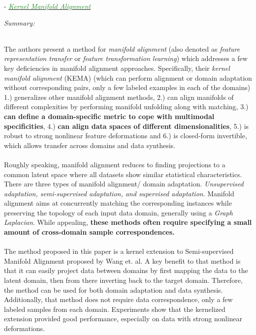 \documentclass[]{article}
\newcommand{\paperentry}[4]{
            \hangindent=1cm
            \textcolor{red}{\cite{#1}} - \href{run:../References/#3}{\textcolor{ForestGreen}{\textit{#2}}}
            
            \noindent            
            \begin{minipage}[t]{0.1\linewidth}\hfill\end{minipage}
            \begin{minipage}[t]{0.8\linewidth}\textcolor{NavyBlue}{{\textit{Summary:}}}#4\end{minipage}
            \vspace{.25cm}
          }
\begin{document}
		\paperentry{Tuia2015KernelManifoldAlignment}
		{Kernel Manifold Alignment}
		{Manifold_Representation_Learning/Alignment/Tuia2015KernelManifoldAlignment.pdf}
		{}\\
		The authors present a method for \textit{manifold alignment} (also denoted as \textit{feature representation transfer} or \textit{feature transformation learning}) 
		which addresses a few key deficiencies in manifold alignment approaches. Specifically, their \textit{kernel manifold alignment} (KEMA) (which can perform alignment or domain adaptation without corresponding pairs, only a few labeled examples in each of the domains) 1.) generalizes other manifold alignment methods, 2.) can align manifolds of different complexities by performing manifold unfolding along with matching, 3.) \textbf{can define a domain-specific metric to cope with multimodal specificities}, 4.) \textbf{can align data spaces of different dimensionalities}, 5.) is robust to strong nonlinear feature deformations and 6.) is closed-form invertible, which allows transfer across domains and data synthesis.
		\\ \\
		Roughly speaking, manifold alignment reduces to finding projections to a common latent space where all datasets show similar statistical characteristics.  There are three types of manifold alignment/ domain adaptation.  \textit{Unsupervised adaptation, semi-supervised adaptation, and supervised adaptation}.  Manifold alignment aims at concurrently matching the corresponding instances while preserving the topology of each input data domain, generally using a \textit{Graph Laplacian}.  While appealing, \textbf{these methods often require specifying a small amount of cross-domain sample correspondences.}
		\\ \\
		The method proposed in this paper is a kernel extension to Semi-supervised Manifold Alignment proposed by Wang et. al.  A key benefit to that method is that it can easily project data between domains by first mapping the data to the latent domain, then from there inverting back to the target domain.  Therefore, the method can be used for both domain adaptation and data synthesis.  Additionally, that method does not require data correspondence, only a few labeled samples from each domain.  Experiments show that the kernelized extension provided good performance, especially on data with strong nonlinear deformations. \\
		
\end{document}
